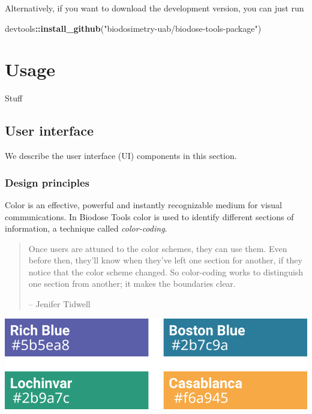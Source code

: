\documentclass[]{scrartcl}
\newenvironment{Shaded}{\begin{snugshade}}{\end{snugshade}}
\newcommand{\KeywordTok}[1]{\textcolor[rgb]{0.13,0.29,0.53}{\textbf{#1}}}
\newcommand{\NormalTok}[1]{#1}
\newcommand{\OperatorTok}[1]{\textcolor[rgb]{0.81,0.36,0.00}{\textbf{#1}}}
\newcommand{\StringTok}[1]{\textcolor[rgb]{0.31,0.60,0.02}{#1}}
\begin{document}
Alternatively, if you want to download the development version, you can just run

\begin{Shaded}
\begin{Highlighting}[]
\NormalTok{devtools}\OperatorTok{::}\KeywordTok{install_github}\NormalTok{(}\StringTok{"biodosimetry-uab/biodose-tools-package"}\NormalTok{)}
\end{Highlighting}
\end{Shaded}

\hypertarget{manual}{%
\section{Usage}\label{manual}}

Stuff

\hypertarget{manual-ui}{%
\subsection{User interface}\label{manual-ui}}

We describe the user interface (UI) components in this section.

\hypertarget{design-principles}{%
\subsubsection{Design principles}\label{design-principles}}

Color is an effective, powerful and instantly recognizable medium for visual communications. In Biodose Tools color is used to identify different sections of information, a technique called \emph{color-coding}.

\begin{quote}
Once users are attuned to the color schemes, they can use them. Even before then, they'll know when they've left one section for another, if they notice that the color scheme changed. So color-coding works to distinguish one section from another; it makes the boundaries clear.

-- Jenifer Tidwell \citep{Tidwel2010}
\end{quote}

\begin{center}\includegraphics{images/user-manual/color-coding} \end{center}
\end{document}
